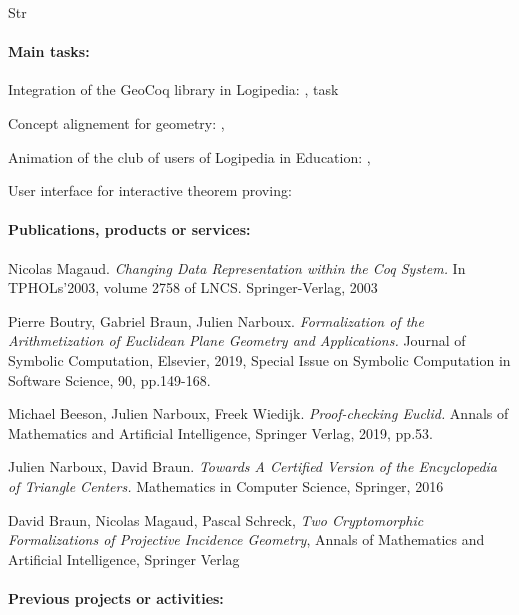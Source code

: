 \begin{sitedescription}{Str}
\paragraph*{Main tasks:}

\begin{compactitem}
\item Integration of the GeoCoq library in Logipedia: , task 
\item Concept alignement for geometry: , 
\item Animation of the club of users of Logipedia in Education: ,  
\item User interface for interactive theorem proving:  
\end{compactitem}

\paragraph*{Publications, products or services:}

\begin{compactitem}
\item Nicolas Magaud. \emph{Changing Data Representation within the Coq System.} In TPHOLs'2003, volume 2758 of LNCS. Springer-Verlag, 2003
\item Pierre Boutry, Gabriel Braun, Julien Narboux. \emph{Formalization of the Arithmetization of Euclidean Plane Geometry and Applications.} Journal of Symbolic Computation, Elsevier, 2019, Special Issue on Symbolic Computation in Software Science, 90, pp.149-168.
\item Michael Beeson, Julien Narboux, Freek Wiedijk. \emph{Proof-checking Euclid.} Annals of Mathematics and Artificial Intelligence, Springer Verlag, 2019, pp.53.
\item Julien Narboux, David Braun. \emph{Towards A Certified Version of the Encyclopedia of Triangle Centers.} Mathematics in Computer Science, Springer, 2016
\item David Braun, Nicolas Magaud, Pascal Schreck, \emph{Two Cryptomorphic Formalizations of Projective Incidence Geometry}, Annals of Mathematics and Artificial Intelligence, Springer Verlag
\end{compactitem}

\paragraph*{Previous projects or activities:}


\end{sitedescription}
